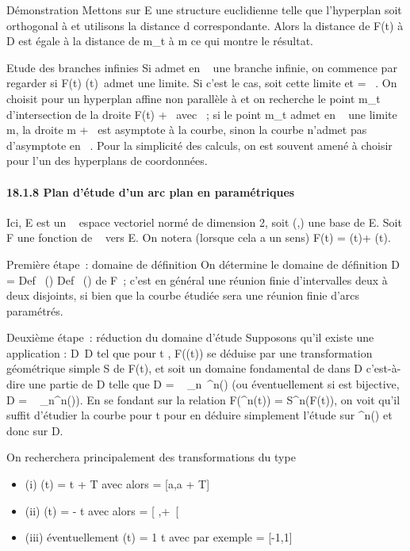 \documentclass[]{article}
\begin{document}
Démonstration Mettons sur E une structure euclidienne telle que
l'hyperplan \Pi soit orthogonal à \vecD et utilisons la
distance d correspondante. Alors la distance de F(t) à D est égale à la
distance de m_t à m ce qui montre le résultat.

Etude des branches infinies Si \Gamma admet en \alpha~ une branche infinie, on
commence par regarder si  F(t) \over
\F(t)\ admet une
limite. Si c'est le cas, soit \vecu cette limite et
\vecD = ~\vecu. On choisit pour \Pi
un hyperplan affine non parallèle à \vecD et on
recherche le point m_t d'intersection de la droite F(t) +
~\vecu avec \Pi~; si le point m_t admet en \alpha~
une limite m, la droite m + ~\vecu est asymptote à la
courbe, sinon la courbe n'admet pas d'asymptote en \alpha~. Pour la simplicité
des calculs, on est souvent amené à choisir pour \Pi l'un des hyperplans
de coordonnées.

\paragraph{18.1.8 Plan d'étude d'un arc plan en paramétriques}

Ici, E est un ~ espace vectoriel normé de dimension 2, soit
(\vec\imath,) une base de E. Soit
F une fonction de ~ vers E. On notera (lorsque cela a un sens) F(t) =
\phi(t)\vec\imath + \psi(t).

Première étape~: domaine de définition On détermine le domaine de
définition D = Def~ (\phi)
\bigcap Def~ (\psi) de F~; c'est en général une réunion
finie d'intervalles deux à deux disjoints, si bien que la courbe étudiée
sera une réunion finie d'arcs paramétrés.

Deuxième étape~: réduction du domaine d'étude Supposons qu'il existe une
application \theta : D\rightarrow~D tel que pour t \inD, F(\theta(t)) se déduise par une
transformation géométrique simple S de F(t), et soit \Delta un domaine
fondamental de \theta dans D c'est-à-dire une partie de D telle que D
= \⋃ ~
_n\in{}~\theta^n(\Delta) (ou éventuellement si \theta est bijective, D
= \⋃ ~
_n\in{}\theta^n(\Delta)). En se fondant sur la relation
F(\theta^n(t)) = S^n(F(t)), on voit qu'il suffit
d'étudier la courbe pour t \in \Delta pour en déduire simplement l'étude sur
\theta^n(\Delta) et donc sur D.

On recherchera principalement des transformations \theta du type

\begin{itemize}
\itemsep1pt\parskip0pt
\item
  (i) \theta(t) = t + T avec alors \Delta = [a,a + T] \bigcapD
\item
  (ii) \theta(t) = \omega - t avec alors \Delta = [ \omega {}
  ,+\infty~[\bigcapD
\item
  (iii) éventuellement \theta(t) = 1 \over t avec par
  exemple \Delta = [-1,1] \bigcapD
\end{itemize}
\end{document}
